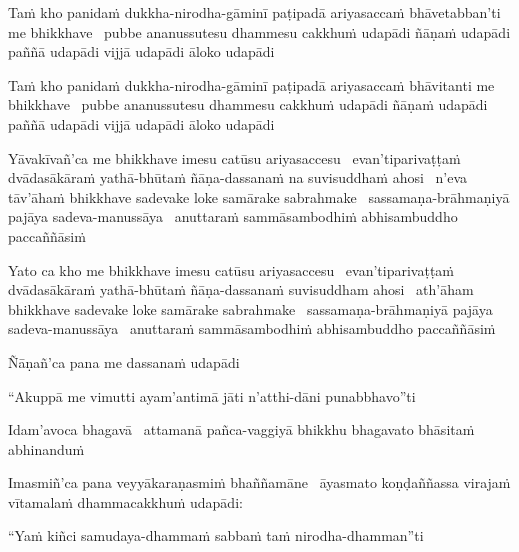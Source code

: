 \begin{pali-hang}
  Taṁ kho panidaṁ dukkha-nirodha-gāminī paṭipadā ariyasaccaṁ bhāvetabban'ti me bhikkhave \breathmark\ pubbe ananussutesu dhammesu cakkhuṁ udapādi ñāṇaṁ udapādi paññā udapādi vijjā udapādi āloko udapādi
\end{pali-hang}

\begin{pali-hang}
  Taṁ kho panidaṁ dukkha-nirodha-gāminī paṭipadā ariyasaccaṁ bhāvitanti me bhikkhave \breathmark\ pubbe ananussutesu dhammesu cakkhuṁ udapādi ñāṇaṁ udapādi paññā udapādi vijjā udapādi āloko udapādi
\end{pali-hang}

\begin{pali-hang}
  Yāvakīvañ'ca me bhikkhave imesu catūsu ariyasaccesu \breathmark\ evan'tiparivaṭṭaṁ dvādasākāraṁ yathā-bhūtaṁ ñāṇa-dassanaṁ na suvisuddhaṁ ahosi \breathmark\ n'eva tāv'āhaṁ bhikkhave sadevake loke samārake sabrahmake \breathmark\ sassamaṇa-brāhmaṇiyā pajāya sadeva-manussāya \breathmark\ anuttaraṁ sammāsambodhiṁ abhisambuddho paccaññāsiṁ
\end{pali-hang}

\begin{pali-hang}
  Yato ca kho me bhikkhave imesu catūsu ariyasaccesu \breathmark\ evan'tiparivaṭṭaṁ dvādasākāraṁ yathā-bhūtaṁ ñāṇa-dassanaṁ suvisuddham ahosi \breathmark\ ath'āham bhikkhave sadevake loke samārake sabrahmake \breathmark\ sassamaṇa-brāhmaṇiyā pajāya sadeva-manussāya \breathmark\ anuttaraṁ sammāsambodhiṁ abhisambuddho paccaññāsiṁ
\end{pali-hang}

Ñāṇañ'ca pana me dassanaṁ udapādi

\begin{pali-hang}
  ``Akuppā me vimutti ayam'antimā jāti n'atthi-dāni punabbhavo''ti
\end{pali-hang}

\begin{pali-hang}
  Idam'avoca bhagavā \breathmark\ attamanā pañca-vaggiyā bhikkhu bhagavato bhāsitaṁ abhinanduṁ
\end{pali-hang}

\begin{pali-hang}
  Imasmiñ'ca pana veyyākaraṇasmiṁ bhaññamāne \breathmark\ āyasmato koṇḍaññassa virajaṁ vītamalaṁ dhammacakkhuṁ udapādi:
\end{pali-hang}

``Yaṁ kiñci samudaya-dhammaṁ sabbaṁ taṁ nirodha-dhamman''ti

